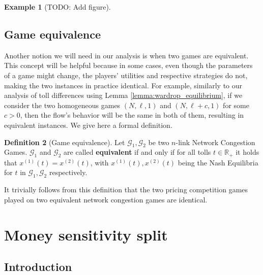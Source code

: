 \documentclass[10pt,a4paper]{book}
\newcommand{\R}{\mathbb{R}}
\newcommand{\Gm}{\mathcal{G}}
\theoremstyle{definition}
\newtheorem{definition}{Definition}[chapter]
\theoremstyle{comment}
\newtheorem{example}[definition]{Example}
\begin{document}
\begin{example}
	[TODO: Add figure]
\end{example}

\section*{Game equivalence}

Another notion we will need in our analysis is when two games are equivalent.
This concept will be helpful because in some cases, even though the parameters of a game might change, the players' utilities and respective strategies do not, making the two instances in practice identical.
For example, similarly to our analysis of toll differences using Lemma \ref{lemma:wardrop_equilibrium}, if we consider the two homogeneous games $(N, \ell, 1)$ and $(N, \ell + c, 1)$ for some $c > 0$, then the flow's behavior will be the same in both of them, resulting in equivalent instances.
We give here a formal definition.

\begin{definition}[Game equivalence]
	\label{definition:game_equivalence}
	Let $\Gm_1, \Gm_2$ be two $n$-link Network Congestion Games.
	$\Gm_1$ and $\Gm_2$ are called \textbf{equivalent} if and only if for all tolls $t \in \R_+$ it holds that $x^{(1)}(t) = x^{(2)}(t)$, with $x^{(1)}(t), x^{(2)}(t)$ being the Nash Equilibria for $t$ in $\Gm_1, \Gm_2$ respectively.
\end{definition}

It trivially follows from this definition that the two pricing competition games played on two equivalent network congestion games are identical.

\chapter{Money sensitivity split}
\label{chapter:split}

\section{Introduction}
\end{document}
